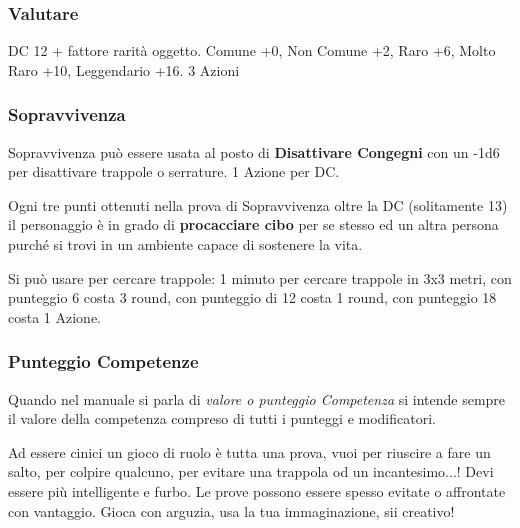 \begin{multicols}{2}
\titlespacing*{\subsubsection}{0pt}{0.5em}{0.5em}\subsubsection*{Valutare}\label{compvalutare}
DC 12 + fattore rarità oggetto. Comune +0, Non Comune +2, Raro +6, Molto Raro +10, Leggendario +16. 3 Azioni

\titlespacing*{\subsubsection}{0pt}{0.5em}{0.5em}\subsubsection*{Sopravvivenza}\label{sopravvivenza}

Sopravvivenza può essere usata al posto di \textbf{Disattivare Congegni} con un -1d6 per disattivare trappole o serrature. 1 Azione per DC.

Ogni tre punti ottenuti nella prova di Sopravvivenza oltre la DC (solitamente 13) il personaggio è in grado di \textbf{procacciare cibo} per se stesso ed un altra persona purché si trovi in un ambiente capace di sostenere la vita.

Si può usare per cercare trappole: 1 minuto per cercare trappole in 3x3 metri, con punteggio 6 costa 3 round, con punteggio di 12 costa 1 round, con punteggio 18 costa 1 Azione.

\subsubsection*{Punteggio Competenze}\label{Punteggio Competenze}

Quando nel manuale si parla di \emph{valore o punteggio Competenza} si intende sempre il valore della competenza compreso di tutti i punteggi e modificatori.

\begin{giocatore}
	Ad essere cinici un gioco di ruolo è tutta una prova, vuoi per riuscire a fare un salto, per colpire qualcuno, per evitare una trappola od un incantesimo...!
	Devi essere più intelligente e furbo. Le prove possono essere spesso evitate o affrontate con vantaggio. Gioca con arguzia, usa la tua immaginazione, sii creativo!
\end{giocatore}



\end{multicols}

